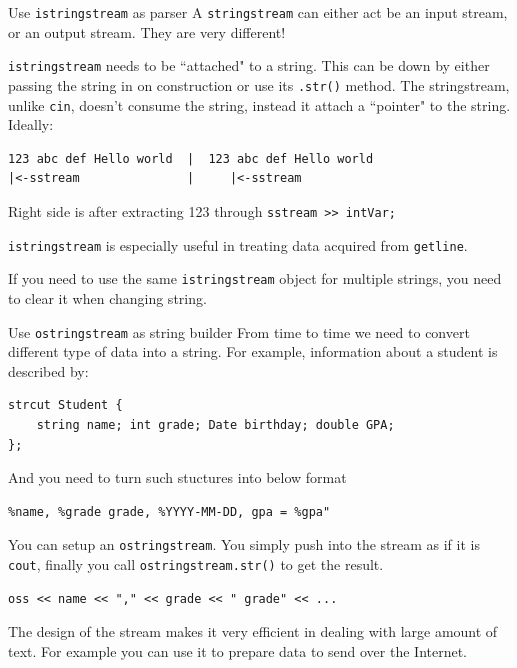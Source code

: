 \begin{frame}[fragile]{Use \texttt{istringstream} as parser }
A \texttt{stringstream} can either act be an input stream, or an output stream. They are very different! 

\texttt{istringstream} needs to be ``attached" to a string. This can be down by either passing the string in on construction or use its \texttt{.str()} method. The stringstream, unlike \texttt{cin}, doesn't consume the string, instead it attach a ``pointer" to the string. Ideally:

\begin{verbatim}
123 abc def Hello world  |  123 abc def Hello world
|<-sstream               |     |<-sstream 
\end{verbatim}

Right side is after extracting 123 through \texttt{sstream >> intVar;}

\texttt{istringstream} is especially useful in treating data acquired from \texttt{getline}. 

 \alert{If you need to use the same \texttt{istringstream} object for multiple strings, you need to clear it when changing string}. 
\end{frame}

\begin{frame}[fragile]{Use \texttt{ostringstream} as string builder}
From time to time we need to convert different type of data into a string. For example, information about a student is described by:
\begin{verbatim}
strcut Student {
    string name; int grade; Date birthday; double GPA;
};
\end{verbatim}
And you need to turn such stuctures into below format
\begin{verbatim}
%name, %grade grade, %YYYY-MM-DD, gpa = %gpa"
\end{verbatim}
You can setup an \texttt{ostringstream}. You simply push into the stream as if it is \texttt{cout}, finally you call \texttt{ostringstream.str()} to get the result. 
\begin{verbatim}
oss << name << "," << grade << " grade" << ... 
\end{verbatim}
The design of the stream makes it very efficient in dealing with large amount of text. For example you can use it to prepare data to send over the Internet.
\end{frame}

